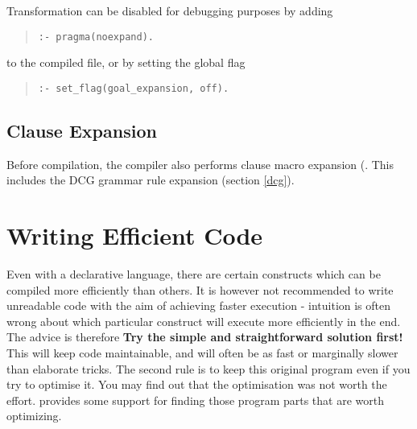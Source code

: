Transformation can be disabled for debugging purposes by adding
\begin{quote} \begin{verbatim}
:- pragma(noexpand).
\end{verbatim}
\end{quote}
to the compiled file, or by setting the global flag
\begin{quote} \begin{verbatim}
:- set_flag(goal_expansion, off).
\end{verbatim}
\end{quote}


\subsection{Clause Expansion}
Before compilation, the compiler also performs clause macro expansion
(.  This includes
the DCG grammar rule expansion (section \ref{dcg}).



\section{Writing Efficient Code}
\label{secefficientcode}
Even with a declarative language, there are certain
constructs which can be compiled more efficiently than others.
It is however not recommended to write unreadable code with the aim
of achieving faster execution - intuition is often wrong about which
particular construct will execute more efficiently in the end.
The advice is therefore {\bf Try the simple and straightforward
solution first!} This will keep code maintainable, and will often be
as fast or marginally slower than elaborate tricks.
The second rule is to keep this original program even if you try
to optimise it. You may find out that the optimisation
was not worth the effort.
{\eclipse} provides some support for finding those program parts
that are worth optimizing.

